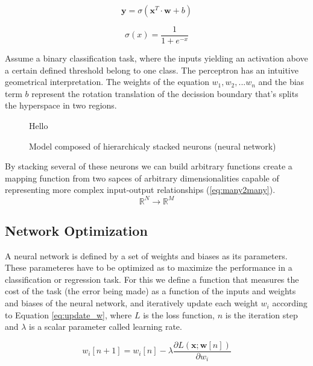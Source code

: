 \begin{equation}
    \mathbf{y} = \sigma(\mathbf{x}^T \cdot \mathbf{w} + b)
    \label{eq:perceptron}
\end{equation}

\begin{equation}
    \sigma (x) = \frac{1}{1 + e^{-x}}
    \label{eq:sigmoid}
\end{equation}

Assume a binary classification task, where the inputs yielding an activation above a certain defined threshold belong to one class. The perceptron has an intuitive geometrical interpretation. The weights of the equation ${w_1, w_2, ... w_n}$ and the bias term $b$ represent the rotation translation of the decission boundary that's splits the hyperspace in two regions.

\begin{figure}
    \center
    Hello
    \caption{Model composed of hierarchicaly stacked neurons (neural network)}
    \label{fig:stacking}
\end{figure}

By stacking several of these neurons we can build arbitrary functions create a mapping function from two sapces of arbitrary dimensionalities capable of representing more complex input-output relationships (\ref{eq:many2many}).
\begin{equation}
    \mathbb{R}^N \rightarrow \mathbb{R}^M
    \label{eq:many2many}
\end{equation}

\subsection{Network Optimization}

A neural network is defined by a set of weights and biases as its parameters. These parameteres have to be optimized as to maximize the performance in a classification or regression task. For this we define a function that measures the cost of the task (the error being made) as a function of the inputs and weights and biases of the neural network, and iteratively update each weight $w_i$ according to Equation \ref{eq:update_w}, where $L$ is the loss function, $n$ is the iteration step and $\lambda$ is a scalar parameter called learning rate.

\begin{equation}
    w_i[n+1] = w_i[n] - \lambda \frac{\partial L(\mathbf{x}; \mathbf{w}[n])}{\partial w_i}
    \label{eq:update_w}
\end{equation}

